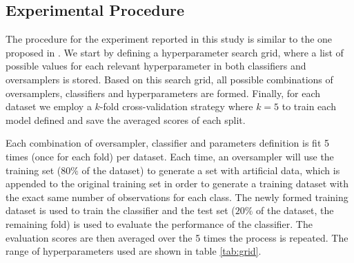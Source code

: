 \documentclass[parskip=full]{scrartcl}
\begin{document}
\subsection{Experimental Procedure}
The procedure for the experiment reported in this study is similar to the one
proposed in \cite{Douzas2019rs}. We start by defining a hyperparameter search
grid, where a list of possible values for each relevant hyperparameter in both
classifiers and oversamplers is stored. Based on this search grid, all possible
combinations of oversamplers, classifiers and hyperparameters are formed.
Finally, for each dataset we employ a $k$-fold cross-validation strategy where
$k=5$ to train each model defined and save the averaged scores of each split.

Each combination of oversampler, classifier and parameters definition is fit 5
times (once for each fold) per dataset. Each time, an oversampler will use the
training set ($80\%$ of the dataset) to generate a set with artificial data,
which is appended to the original training set in order to generate a training
dataset with the exact same number of observations for each class. The newly
formed training dataset is used to train the classifier and the test set ($20\%$
of the dataset, the remaining fold) is used to evaluate the performance of the
classifier. The evaluation scores are then averaged over the 5 times the process
is repeated. The range of hyperparameters used are shown in table
\ref{tab:grid}.
\end{document}
